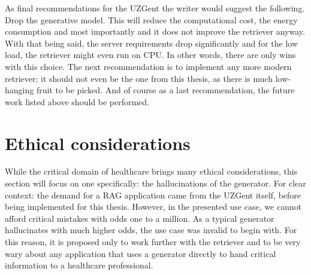 As final recommendations for the UZGent the writer would suggest the following. Drop the generative model. This will reduce the computational cost, the energy consumption and most importantly and it does not improve the retriever anyway. With that being said, the server requirements drop significantly and for the low load, the retriever might even run on CPU. In other words, there are only wins with this choice. The next recommendation is to implement any more modern retriever; it should not even be the one from this thesis, as there is much low-hanging fruit to be picked. And of course as a last recommendation, the future work listed above should be performed.

\section{Ethical considerations}
\label{Ethical considerations}
While the critical domain of healthcare brings many ethical considerations, this section will focus on one specifically: the hallucinations of the generator. For clear context: the demand for a RAG application came from the UZGent itself, before being implemented for this thesis. However, in the presented use case, we cannot afford critical mistakes with odds one to a million. As a typical generator hallucinates with much higher odds, the use case was invalid to begin with. For this reason, it is proposed only to work further with the retriever and to be very wary about any application that uses a generator directly to hand critical information to a healthcare professional.

